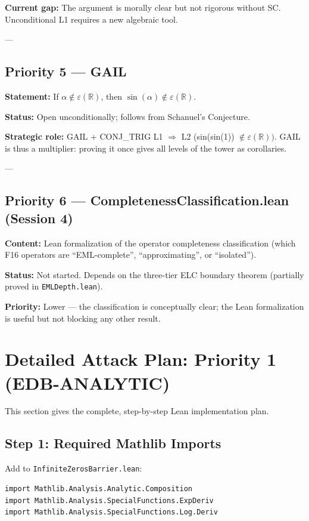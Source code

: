 \documentclass[12pt]{article}
\theoremstyle{definition}
\begin{document}
\textbf{Current gap:} The argument is morally clear but not rigorous without SC.
Unconditional L1 requires a new algebraic tool.

---

\subsection{Priority 5 — GAIL}

\textbf{Statement:} If $\alpha \notin \varepsilon(\mathbb{R})$, then
$\sin(\alpha) \notin \varepsilon(\mathbb{R})$.

\textbf{Status:} Open unconditionally; follows from Schanuel's Conjecture.

\textbf{Strategic role:} GAIL + CONJ\_TRIG L1 $\Rightarrow$ L2 (sin(sin(1)) $\notin
\varepsilon(\mathbb{R}))$.  GAIL is thus a multiplier: proving it once gives
all levels of the tower as corollaries.

---

\subsection{Priority 6 — CompletenessClassification.lean (Session 4)}

\textbf{Content:} Lean formalization of the operator completeness classification
(which F16 operators are ``EML-complete'', ``approximating'', or ``isolated'').

\textbf{Status:} Not started.  Depends on the three-tier ELC boundary theorem
(partially proved in \texttt{EMLDepth.lean}).

\textbf{Priority:} Lower — the classification is conceptually clear; the Lean
formalization is useful but not blocking any other result.

\section{Detailed Attack Plan: Priority 1 (EDB-ANALYTIC)}

This section gives the complete, step-by-step Lean implementation plan.

\subsection{Step 1: Required Mathlib Imports}

Add to \texttt{InfiniteZerosBarrier.lean}:
\begin{verbatim}
import Mathlib.Analysis.Analytic.Composition
import Mathlib.Analysis.SpecialFunctions.ExpDeriv
import Mathlib.Analysis.SpecialFunctions.Log.Deriv
\end{verbatim}
\end{document}
